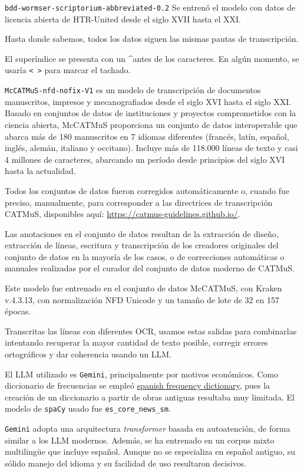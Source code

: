 \documentclass[11pt,a4paper]{article}
\begin{document}
\texttt{bdd-wormser-scriptorium-abbreviated-0.2} Se entrenó el modelo con datos de licencia abierta de HTR-United desde el siglo XVII hasta el XXI.

Hasta donde sabemos, todos los datos siguen las mismas pautas de transcripción.

El superíndice se presenta con un \textasciicircum antes de los caracteres. En algún momento, se usaría \texttt{< >} para marcar el tachado.

\texttt{McCATMuS-nfd-nofix-V1} es un modelo de transcripción de documentos manuscritos, impresos y mecanografiados desde el siglo XVI hasta el siglo XXI. Basado en conjuntos de datos de instituciones y proyectos comprometidos con la ciencia abierta, McCATMuS proporciona un conjunto de datos interoperable que abarca más de 180 manuscritos en 7 idiomas diferentes (francés, latín, español, inglés, alemán, italiano y occitano). Incluye más de 118.000 líneas de texto y casi 4 millones de caracteres, abarcando un período desde principios del siglo XVI hasta la actualidad.

Todos los conjuntos de datos fueron corregidos automáticamente o, cuando fue preciso, manualmente, para corresponder a las directrices de transcripción CATMuS, disponibles aquí: \url{https://catmus-guidelines.github.io/}.

Las anotaciones en el conjunto de datos resultan de la extracción de diseño, extracción de líneas, escritura y transcripción de los creadores originales del conjunto de datos en la mayoría de los casos, o de correcciones automáticas o manuales realizadas por el curador del conjunto de datos moderno de CATMuS.

Este modelo fue entrenado en el conjunto de datos McCATMuS, con Kraken v.4.3.13, con normalización NFD Unicode y un tamaño de lote de 32 en 157 épocas.

Transcritas las líneas con diferentes OCR, usamos estas salidas para combinarlas intentando recuperar la mayor cantidad de texto posible, corregir errores ortográficos y dar coherencia usando un LLM.

El LLM utilizado es \texttt{Gemini}, principalmente por motivos económicos. Como diccionario de frecuencias se empleó \href{https://github.com/hermitdave/FrequencyWords/blob/master/content/2016/es/es_full.txt}{spanish frequency dictionary}, pues la creación de un diccionario a partir de obras antiguas resultaba muy limitada. El modelo de \texttt{spaCy} usado fue \texttt{es\_core\_news\_sm}.

\texttt{Gemini} adopta una arquitectura \textit{transformer} basada en autoatención, de forma similar a los LLM modernos. Además, se ha entrenado en un corpus mixto multilingüe que incluye español. Aunque no se especializa en español antiguo, su sólido manejo del idioma y su facilidad de uso resultaron decisivos.
\end{document}
